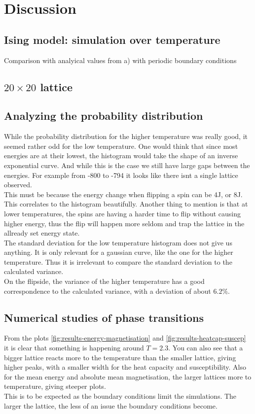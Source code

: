 \documentclass[../main.tex]{subfiles}
\begin{document}
\section{Discussion}

\subsection{Ising model: simulation over temperature}
Comparison with analyical values from a) with periodic boundary conditions




\subsection{$20 \times 20$ lattice}




\subsection{Analyzing the probability distribution}
While the probability distribution for the higher temperature was really good, it seemed rather odd for the low temperature. One would think that since most energies are at their lowest, the histogram would take the shape of an inverse exponential curve. And while this is the case we still have large gaps between the energies. For example from -800 to -794 it looks like there isnt a single lattice observed. \\
This must be because the energy change when flipping a spin can be 4J, or 8J. This correlates to the histogram beautifully. Another thing to mention is that at lower temperatures, the spins are having a harder time to flip without causing higher energy, thus the flip will happen more seldom and trap the lattice in the allready set energy state.\\
The standard deviation for the low temperature histogram does not give us anything. It is only relevant for a gaussian curve, like the one for the higher temperature. Thus it is irrelevant to compare the standard deviation to the calculated variance.\\
On the flipside, the variance of the higher temperature has a good correspondence to the calculated variance, with a deviation of about $6.2\%$.


\subsection{Numerical studies of phase transitions}
From the plots \ref{fig:results-energy-magnetisation} and \ref{fig:results-heatcap-suscep} it is clear that something is happening around $T = 2.3$. You can also see that a bigger lattice reacts more to the temperature than the smaller lattice, giving higher peaks, with a smaller width for the heat capacity and susceptibility. Also for the mean energy and absolute mean magnetisation, the larger lattices  more to temperature, giving steeper plots.\\
This is to be expected as the boundary conditions limit the simulations. The larger the lattice, the less of an issue the boundary conditions become.
\end{document}
